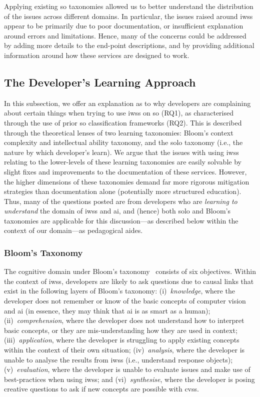 Applying existing \gls{so} taxonomies allowed us to better understand the distribution of the issues across different domains. In particular, the issues raised around \glspl{iws} appear to be primarily due to poor documentation, or insufficient explanation around errors and limitations. Hence, many of the concerns could be addressed by adding more details to the end-point descriptions, and by providing additional information around how these services are designed to work.

\subsection{The Developer's Learning Approach}
\label{icse2020:ssec:bloomsolo}

In this subsection, we offer an explanation as to why developers are complaining about certain things when trying to use \glspl{iws} on \gls{so} (RQ1), as characterised through the use of prior \gls{so} classification frameworks (RQ2). This is described through the theoretical lenses of two learning taxonomies: Bloom's context complexity and intellectual ability taxonomy, and the \gls{solo} taxonomy (i.e., the nature by which developer's learn). We argue that the issues with using \glspl{iws} relating to the lower-levels of these learning taxonomies are easily solvable by slight fixes and improvements to the documentation of these services. However, the higher dimensions of these taxonomies demand far more rigorous mitigation strategies than documentation alone (potentially more structured education). Thus, many of the questions posted are from developers who are \textit{learning to understand} the domain of \glspl{iws} and \gls{ai}, and (hence) both \gls{solo} and Bloom's taxonomies are applicable for this discussion---as described below within the context of our domain---as pedagogical aides.

\subsubsection{Bloom's Taxonomy}

The cognitive domain under Bloom's taxonomy~\citep{Krathwohl:2001wr} consists of six objectives. Within the context of \glspl{iws}, developers are likely to ask questions due to causal links that exist in the following layers of Bloom's taxonomy:
%
(i)~\textit{knowledge}, where the developer does not remember or know of the basic concepts of computer vision and \gls{ai} (in essence, they may think that \gls{ai} is as smart as a human);
%
(ii)~\textit{comprehension}, where the developer does not understand how to interpret basic concepts, or they are mis-understanding how they are used in context;
%
(iii)~\textit{application}, where the developer is struggling to apply existing concepts within the context of their own situation;
%
(iv)~\textit{analysis}, where the developer is unable to analyse the results from \glspl{iws} (i.e., understand response objects);
%
(v)~\textit{evaluation}, where the developer is unable to evaluate issues and make use of best-practices when using \glspl{iws}; and
%
(vi)~\textit{synthesise}, where the developer is posing creative questions to ask if new concepts are possible with \glspl{cvs}.


